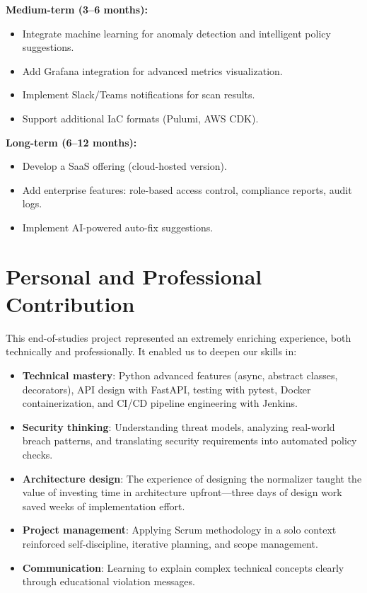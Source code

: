 \textbf{Medium-term (3--6 months):}
\begin{itemize}
    \item Integrate machine learning for anomaly detection and intelligent policy suggestions.
    \item Add Grafana integration for advanced metrics visualization.
    \item Implement Slack/Teams notifications for scan results.
    \item Support additional IaC formats (Pulumi, AWS CDK).
\end{itemize}

\textbf{Long-term (6--12 months):}
\begin{itemize}
    \item Develop a SaaS offering (cloud-hosted version).
    \item Add enterprise features: role-based access control, compliance reports, audit logs.
    \item Implement AI-powered auto-fix suggestions.
\end{itemize}

\section*{Personal and Professional Contribution}

This end-of-studies project represented an extremely enriching experience, both technically and professionally. It enabled us to deepen our skills in:

\begin{itemize}
    \item \textbf{Technical mastery}: Python advanced features (async, abstract classes, decorators), API design with FastAPI, testing with pytest, Docker containerization, and CI/CD pipeline engineering with Jenkins.
    \item \textbf{Security thinking}: Understanding threat models, analyzing real-world breach patterns, and translating security requirements into automated policy checks.
    \item \textbf{Architecture design}: The experience of designing the normalizer taught the value of investing time in architecture upfront—three days of design work saved weeks of implementation effort.
    \item \textbf{Project management}: Applying Scrum methodology in a solo context reinforced self-discipline, iterative planning, and scope management.
    \item \textbf{Communication}: Learning to explain complex technical concepts clearly through educational violation messages.
\end{itemize}


